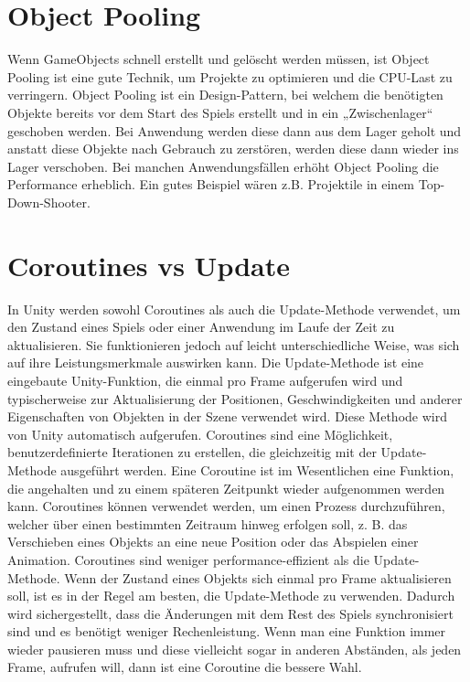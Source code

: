 \cite{_drawcallbatching}

\section{Object Pooling}
Wenn GameObjects schnell erstellt und gelöscht werden müssen, ist Object Pooling ist eine gute Technik, um Projekte zu optimieren und die CPU-Last zu verringern. Object Pooling ist ein Design-Pattern, bei welchem die benötigten Objekte bereits vor dem Start des Spiels erstellt und in ein „Zwischenlager“ geschoben werden. Bei Anwendung werden diese dann aus dem Lager geholt und anstatt diese Objekte nach Gebrauch zu zerstören, werden diese dann wieder ins Lager verschoben. Bei manchen Anwendungsfällen erhöht Object Pooling die Performance erheblich. Ein gutes Beispiel wären z.B. Projektile in einem Top-Down-Shooter.
\cite{_objectpooling}

\section{Coroutines vs Update}
In Unity werden sowohl Coroutines als auch die Update-Methode verwendet, um den Zustand eines Spiels oder einer Anwendung im Laufe der Zeit zu aktualisieren. Sie funktionieren jedoch auf leicht unterschiedliche Weise, was sich auf ihre Leistungsmerkmale auswirken kann. Die Update-Methode ist eine eingebaute Unity-Funktion, die einmal pro Frame aufgerufen wird und typischerweise zur Aktualisierung der Positionen, Geschwindigkeiten und anderer Eigenschaften von Objekten in der Szene verwendet wird. Diese Methode wird von Unity automatisch aufgerufen. Coroutines sind eine Möglichkeit, benutzerdefinierte Iterationen zu erstellen, die gleichzeitig mit der Update-Methode ausgeführt werden. Eine Coroutine ist im Wesentlichen eine Funktion, die angehalten und zu einem späteren Zeitpunkt wieder aufgenommen werden kann. Coroutines können verwendet werden, um einen Prozess durchzuführen, welcher über einen bestimmten Zeitraum hinweg erfolgen soll, z. B. das Verschieben eines Objekts an eine neue Position oder das Abspielen einer Animation. Coroutines sind weniger performance-effizient als die Update-Methode. Wenn der Zustand eines Objekts sich einmal pro Frame aktualisieren soll, ist es in der Regel am besten, die Update-Methode zu verwenden. Dadurch wird sichergestellt, dass die Änderungen mit dem Rest des Spiels synchronisiert sind und es benötigt weniger Rechenleistung. Wenn man eine Funktion immer wieder pausieren muss und diese vielleicht sogar in anderen Abständen, als jeden Frame, aufrufen will, dann ist eine Coroutine die bessere Wahl.
\cite{dickinson2015unity}

